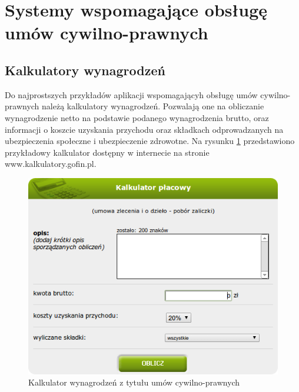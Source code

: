 \section[Systemy wspomagające obsługę umów cywilno-prawnych][Systemy wspomagające obsługę umów cywilno-prawnych]{Systemy wspomagające obsługę umów cywilno-prawnych}

\subsection[Kalkulatory wynagrodzeń][Kalkulatory wynagrodzeń]{Kalkulatory wynagrodzeń}
Do najprostszych przykładów aplikacji wspomagającyh obsługę umów cywilno-prawnych należą kalkulatory wynagrodzeń. Pozwalają one na obliczanie wynagrodzenie netto na podstawie podanego wynagrodzenia brutto, oraz informacji o koszcie uzyskania przychodu oraz składkach odprowadzanych na ubezpieczenia społeczne i ubezpieczenie zdrowotne. Na rysunku \ref{kalkulator} przedstawiono przykładowy kalkulator dostępny w internecie na stronie www.kalkulatory.gofin.pl.

\begin{figure}[tdh]
    \begin{center}
	\includegraphics[scale=.6]{img/kalkulator.png}
	\caption{Kalkulator wynagrodzeń z tytułu umów cywilno-prawnych}
	\label{kalkulator}
    \end{center}
\end{figure}

